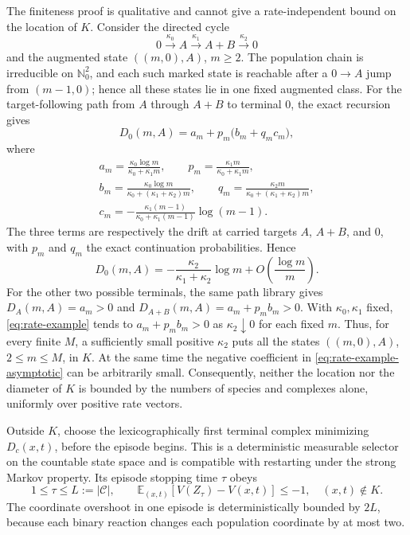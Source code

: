 \begin{remark}\label{rem:rate-dependence}
The finiteness proof is qualitative and cannot give a rate-independent bound
on the location of \(K\).  Consider the directed cycle
\[
 0\xrightarrow{\kappa_0}A
 \xrightarrow{\kappa_1}A+B
 \xrightarrow{\kappa_2}0
\]
and the augmented state \(((m,0),A)\), \(m\ge2\).  The population chain is
irreducible on \(\mathbb N_0^2\), and each such marked state is reachable
after a \(0\to A\) jump from \((m-1,0)\); hence all these states lie in one
fixed augmented class.  For the target-following path from \(A\) through
\(A+B\) to terminal \(0\), the exact recursion gives
\begin{equation}\label{eq:rate-example}
 D_0(m,A)=a_m+p_m\bigl(b_m+q_mc_m\bigr),
\end{equation}
where
\[
\begin{gathered}
 a_m=\frac{\kappa_0\log m}{\kappa_0+\kappa_1m},\qquad
 p_m=\frac{\kappa_1m}{\kappa_0+\kappa_1m},\\
 b_m=\frac{\kappa_0\log m}{\kappa_0+(\kappa_1+\kappa_2)m},\qquad
 q_m=\frac{\kappa_2m}{\kappa_0+(\kappa_1+\kappa_2)m},\\
 c_m=-\frac{\kappa_1(m-1)}{\kappa_0+\kappa_1(m-1)}\log(m-1).
\end{gathered}
\]
The three terms are respectively the drift at carried targets \(A\),
\(A+B\), and \(0\), with \(p_m\) and \(q_m\) the exact continuation
probabilities.  Hence
\begin{equation}\label{eq:rate-example-asymptotic}
 D_0(m,A)=-\frac{\kappa_2}{\kappa_1+\kappa_2}\log m
 +O\!\left(\frac{\log m}{m}\right).
\end{equation}
For the other two possible terminals, the same path library gives
\(D_A(m,A)=a_m>0\) and
\(D_{A+B}(m,A)=a_m+p_mb_m>0\).  With \(\kappa_0,\kappa_1\) fixed,
\eqref{eq:rate-example} tends to \(a_m+p_mb_m>0\) as
\(\kappa_2\downarrow0\) for each fixed \(m\).  Thus, for every finite
\(M\), a sufficiently small positive \(\kappa_2\) puts all the states
\(((m,0),A)\), \(2\le m\le M\), in \(K\).  At the same time the negative
coefficient in \eqref{eq:rate-example-asymptotic} can be arbitrarily small.
Consequently, neither the location nor the diameter of \(K\) is bounded by the
numbers of species and complexes alone, uniformly over positive rate vectors.
\end{remark}

Outside \(K\), choose the lexicographically first terminal complex minimizing
\(D_c(x,t)\), before the episode begins.  This is a deterministic measurable
selector on the countable state space and is compatible with restarting
under the strong Markov property.  Its episode stopping time \(\tau\) obeys
\begin{equation}\label{eq:episode-drift}
  1\le\tau\le L:=|\mathcal C|,
  \qquad
  \mathbb E_{(x,t)}[V(Z_\tau)-V(x,t)]\le-1,
  \quad (x,t)\notin K.
\end{equation}
The coordinate overshoot in one episode is deterministically bounded by
\(2L\), because each binary reaction changes each population coordinate by
at most two.

